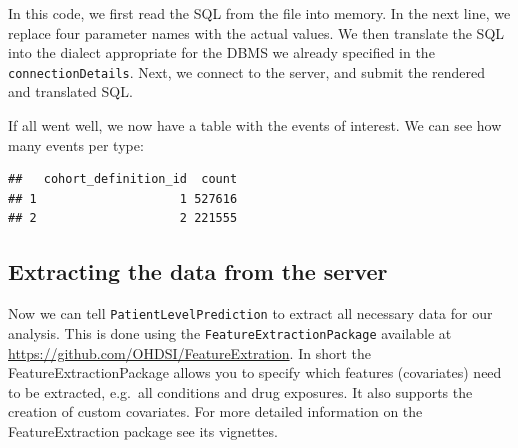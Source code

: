\documentclass[]{article}
\newenvironment{Shaded}{\begin{snugshade}}{\end{snugshade}}
\newcommand{\KeywordTok}[1]{\textcolor[rgb]{0.13,0.29,0.53}{\textbf{#1}}}
\newcommand{\DataTypeTok}[1]{\textcolor[rgb]{0.13,0.29,0.53}{#1}}
\newcommand{\StringTok}[1]{\textcolor[rgb]{0.31,0.60,0.02}{#1}}
\newcommand{\OperatorTok}[1]{\textcolor[rgb]{0.81,0.36,0.00}{\textbf{#1}}}
\newcommand{\NormalTok}[1]{#1}
\begin{document}
In this code, we first read the SQL from the file into memory. In the
next line, we replace four parameter names with the actual values. We
then translate the SQL into the dialect appropriate for the DBMS we
already specified in the \texttt{connectionDetails}. Next, we connect to
the server, and submit the rendered and translated SQL.

If all went well, we now have a table with the events of interest. We
can see how many events per type:

\begin{Shaded}
\end{Shaded}

\begin{verbatim}
##   cohort_definition_id  count
## 1                    1 527616
## 2                    2 221555
\end{verbatim}

\subsection{Extracting the data from the
server}\label{extracting-the-data-from-the-server}

Now we can tell \texttt{PatientLevelPrediction} to extract all necessary
data for our analysis. This is done using the
\texttt{FeatureExtractionPackage} available at
\url{https://github.com/OHDSI/FeatureExtration}. In short the
FeatureExtractionPackage allows you to specify which features
(covariates) need to be extracted, e.g.~all conditions and drug
exposures. It also supports the creation of custom covariates. For more
detailed information on the FeatureExtraction package see its vignettes.
\end{document}
